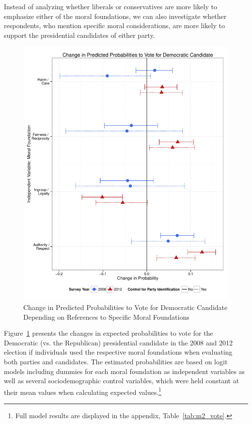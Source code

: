 \documentclass[12pt]{article}
\begin{document}
Instead of analyzing whether liberals or conservatives are more likely to emphasize either of the moral foundations, we can also investigate whether respondents, who mention specific moral considerations, are more likely to support the presidential candidates of either party. 

\begin{figure}\centering
\includegraphics[scale=.4]{../calc/fig/m2_vote.pdf}
\caption{Change in Predicted Probabilities to Vote for Democratic Candidate Depending on References to Specific Moral Foundations}\label{fig:m2_vote}
\end{figure}

Figure~\ref{fig:m2_vote} presents the changes in expected probabilities to vote for the Democratic (vs. the Republican) presidential candidate in the 2008 and 2012 election if individuals used the respective moral foundations when evaluating both parties and candidates. The estimated probabilities are based on logit models including dummies for each moral foundation as independent variables as well as several sociodemographic control variables, which were held constant at their mean values when calculating expected values.\footnote{Full model results are displayed in the appendix, Table~\ref{tab:m2_vote}.}
\end{document}
